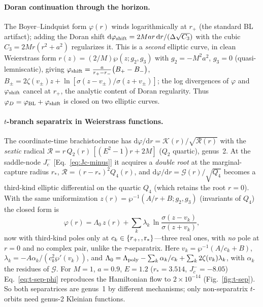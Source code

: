 \documentclass[
    aps, prd, twocolumn, superscriptaddress,
    showpacs, nofootinbib, floatfix
]{revtex4-2}
\newcommand{\rp}{r_{+}}
\newcommand{\dd}{\mathrm{d}}
\begin{document}
\paragraph{Doran continuation through the horizon.} The Boyer--Lindquist form
$\varphi(r)$ winds logarithmically at $\rp$ (the standard BL artifact); adding the
Doran shift $\dd\varphi_{\rm shift}=2Mar\,\dd r/(\Delta\sqrt{C_3})$ with the cubic
$C_3=2Mr(r^2+a^2)$ regularizes it. This is a \emph{second} elliptic curve, in
clean Weierstrass form $r(z)=(2/M)\wp(z;g_2,g_3)$ with $g_2=-M^2a^2$, $g_3=0$
(quasi-lemniscatic), giving
$\varphi_{\rm shift}=\tfrac{a}{r_+-r_-}\big(B_+-B_-\big)$,
$B_\pm=2\zeta(v_\pm)z+\ln[\sigma(z-v_\pm)/\sigma(z+v_\pm)]$; the log divergences of
$\varphi$ and $\varphi_{\rm shift}$ cancel at $\rp$, the analytic content of Doran
regularity. Thus $\varphi_D=\varphi_{\rm BL}+\varphi_{\rm shift}$ is closed on two
elliptic curves.

\paragraph{$t$-branch separatrix in Weierstrass functions.} The coordinate-time
brachistochrone has $\dd\varphi/\dd r=\mathcal K(r)/\sqrt{\mathcal R(r)}$ with the
\emph{sextic} radical $\mathcal R=r\,Q_2(r)\,[(E^2-1)r+2M]$ ($Q_2$ quartic),
genus~2. At the saddle-node $J_c^-$ [Eq.~\eqref{eq:Jc-minus}] it acquires a
\emph{double root} at the marginal-capture radius $r_*$,
$\mathcal R=(r-r_*)^2 Q_4(r)$, and
$\dd\varphi/\dd r=\mathcal G(r)/\sqrt{Q_4}$ becomes a third-kind elliptic
differential on the quartic $Q_4$ (which retains the root $r=0$). With the same
uniformization $z(r)=\wp^{-1}(A/r+B;g_2,g_3)$ (invariants of $Q_4$) the closed
form is
\begin{equation}
    \varphi(r)=\Lambda_0\,z(r)+\sum_{k}\lambda_k\,
      \ln\frac{\sigma(z-v_k)}{\sigma(z+v_k)},
    \label{eq:t-sep-phi}
\end{equation}
now with third-kind poles only at $c_k\in\{\rp,\rm,r_*\}$---three real ones, with
\emph{no} pole at $r=0$ and no complex pair, unlike the $\tau$-separatrix. Here
$v_k=\wp^{-1}(A/c_k+B)$, $\lambda_k=-A\alpha_k/(c_k^2\wp'(v_k))$, and
$\Lambda_0=\Lambda_{\rm poly}-\sum_k\alpha_k/c_k+\sum_k 2\zeta(v_k)\lambda_k$,
with $\alpha_k$ the residues of $\mathcal G$. For $M=1$, $a=0.9$, $E=1.2$
($r_*=3.514$, $J_c^-=-8.05$) Eq.~\eqref{eq:t-sep-phi} reproduces the Hamiltonian
flow to $2\times10^{-14}$ (Fig.~\ref{fig:t-sep}). So both separatrices are
genus~1 by different mechanisms; only non-separatrix $t$-orbits need genus-2
Kleinian functions.
\end{document}
